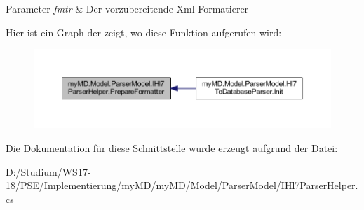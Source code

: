 \begin{DoxyParams}{Parameter}
{\em fmtr} & Der vorzubereitende Xml-\/\+Formatierer\\
\hline
\end{DoxyParams}
Hier ist ein Graph der zeigt, wo diese Funktion aufgerufen wird\+:\nopagebreak
\begin{figure}[H]
\begin{center}
\leavevmode
\includegraphics[width=350pt]{interfacemy_m_d_1_1_model_1_1_parser_model_1_1_i_hl7_parser_helper_ab4114a84678d1b0ce5df7fdc00119dc4_icgraph}
\end{center}
\end{figure}


Die Dokumentation für diese Schnittstelle wurde erzeugt aufgrund der Datei\+:\begin{DoxyCompactItemize}
\item 
D\+:/\+Studium/\+W\+S17-\/18/\+P\+S\+E/\+Implementierung/my\+M\+D/my\+M\+D/\+Model/\+Parser\+Model/\mbox{\hyperlink{_i_hl7_parser_helper_8cs}{I\+Hl7\+Parser\+Helper.\+cs}}\end{DoxyCompactItemize}
